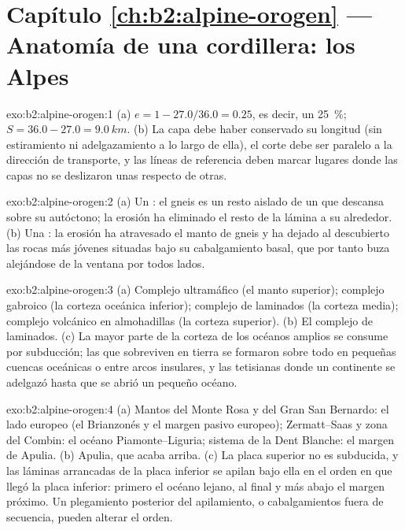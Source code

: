 \section*{Capítulo \ref{ch:b2:alpine-orogen} --- Anatomía de una cordillera: los Alpes}

\begin{solution}{exo:b2:alpine-orogen:1}
(a) $e = 1 - 27.0/36.0 = 0.25$, es decir, un \qty{25}{\percent}; $S = 36.0 - 27.0 =
\qty{9.0}{km}$. (b) La capa debe haber conservado su longitud (sin estiramiento ni adelgazamiento a lo largo de ella),
el corte debe ser paralelo a la dirección de transporte, y las líneas de referencia deben marcar lugares
donde las capas no se deslizaron unas respecto de otras.
\end{solution}

\begin{solution}{exo:b2:alpine-orogen:2}
(a) Un : el gneis es un resto aislado de un  que descansa sobre su autóctono;
la erosión ha eliminado el resto de la lámina a su alrededor. (b) Una : la erosión ha
atravesado el manto de gneis y ha dejado al descubierto las rocas más jóvenes situadas bajo su cabalgamiento basal, que
por tanto buza alejándose de la ventana por todos lados.
\end{solution}

\begin{solution}{exo:b2:alpine-orogen:3}
(a) Complejo ultramáfico (el manto superior); complejo gabroico (la corteza oceánica inferior);
complejo de  laminados (la corteza media); complejo volcánico en almohadillas (la corteza superior).
(b) El complejo de  laminados. (c) La mayor parte de la corteza de los océanos amplios se consume por subducción;
las  que sobreviven en tierra se formaron sobre todo en pequeñas cuencas oceánicas o entre arcos
insulares, y las tetisianas donde un continente se adelgazó hasta que se abrió un pequeño océano.
\end{solution}

\begin{solution}{exo:b2:alpine-orogen:4}
(a) Mantos del Monte Rosa y del Gran San Bernardo: el lado europeo (el Brianzonés y el
margen pasivo europeo); Zermatt--Saas y zona del Combin: el océano Piamonte--Liguria; sistema de la Dent
Blanche: el margen de Apulia. (b) Apulia, que acaba arriba. (c) La placa superior no
es subducida, y las láminas arrancadas de la placa inferior se apilan bajo ella en el orden en que
llegó la placa inferior: primero el océano lejano, al final y más abajo el margen próximo. Un plegamiento posterior del apilamiento,
o cabalgamientos fuera de secuencia, pueden alterar el orden.
\end{solution}


